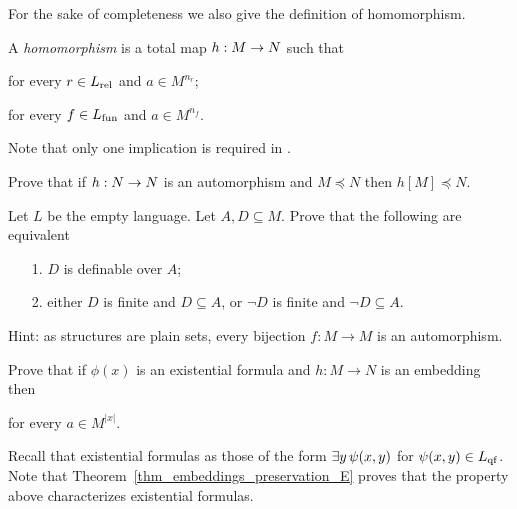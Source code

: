 \documentclass[creche.tex]{subfiles}
\begin{document}

For the sake of completeness we also give the definition of homomorphism.

\begin{definition}\label{def_homomorphism}
A \emph{homomorphism} is a total map $h:M\rightarrow N$ such that

\qquad for every $r\in L_{\rm rel}$ and $a\in M^{n_r}$;\smallskip\par

\qquad  for every $f\in L_{\rm fun}$ and $a\in M^{n_f}$.

Note that only one implication is required in .\QED
\end{definition}

\begin{exercise}
Prove that if $h:N\rightarrow N$ is an automorphism and $M\preceq N$ then $h[M]\preceq N$.\QED
\end{exercise}

\begin{exercise}
Let $L$ be the empty language.
Let $A,D\subseteq M$.
Prove that the following are equivalent
\begin{itemize}
 \item[1.] $D$ is definable over $A$;
 \item[2.] either $D$ is finite and $D\subseteq A$, or $\neg D$ is finite and $\neg D\subseteq A$.
\end{itemize}
Hint: as structures are plain sets, every bijection $f:M\to M$ is an automorphism.\QED
\end{exercise}

\begin{exercise}\label{dlorlkurb}
Prove that if $\phi(x)$ is an existential formula and $h:M\to N$ is an embedding then

\hfill for every $a\in M^{|x|}$.

Recall that existential formulas as those of the form $\exists y\,\psi(x,y)$ for $\psi(x,y)\in L_{\rm qf}$.
Note that Theorem~\ref{thm_embeddings_preservation_E} proves that the property above characterizes existential formulas.\QED

\end{exercise}
\end{document}
